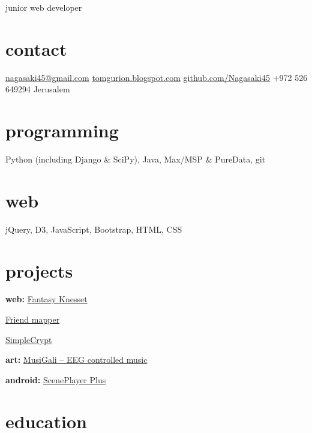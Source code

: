 \documentclass[]{friggeri-cv}  %
\begin{document}
       {junior web developer}


\begin{aside}
\section{contact}
\href{mailto:nagasaki45@gmail.com}{nagasaki45@gmail.com}
\href{http://tomgurion.blogspot.com}{tomgurion.blogspot.com}
\href{https://github.com/Nagasaki45}{github.com/Nagasaki45}
+972 526 649294
Jerusalem

\section{programming}
Python (including Django \& SciPy), Java, Max/MSP \& PureData, git

\section{web}
jQuery, D3, JavaScript, Bootstrap, HTML, CSS

\section{projects}
\textbf{web:}
\href{http://fantasy-knesset.herokuapp.com/}{Fantasy Knesset}

\href{http://friends-mapper.herokuapp.com/}{Friend mapper}

\href{http://simplecrypt.appspot.com/}{SimpleCrypt}

\textbf{art:}
\href{http://tomgurion.blogspot.co.il/2013/10/musigali-eeg-controlled-music-for-brain.html}{MusiGali -- EEG controlled music}

\textbf{android:}
\href{https://play.google.com/store/apps/details?id=com.nagasaki45.sceneplayerplus}{ScenePlayer Plus}

\end{aside}


\section{education}
\end{document}
